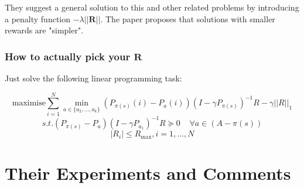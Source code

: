\documentclass{article}
\begin{document}
    They suggest a general solution to this and other related problems by introducing a penalty function $-\lambda ||\mathbf{R}||$. The paper proposes that solutions with smaller rewards are "simpler".

    


    \subsubsection{How to actually pick your $\mathbf{R}$}

    Just solve the following linear programming task:

    $$\text{maximise} \sum_{i=1}^N \min_{a \in \{ a_2, \dots, a_k \}} (P_{\pi(s)}(i)- P_a(i)) (I - \gamma P_{\pi(s)})^{-1} R - \gamma ||R||_1$$
    $$s.t. (P_{\pi(s)} - P_a)(I - \gamma P_{a_1})^{-1} R \succeq 0 \;\;\;\; \forall a \in (A - \pi(s)) $$
    $$|R_i| \le R_{\max}, i = 1, \dots, N$$


    \section{Their Experiments and Comments}
\end{document}
